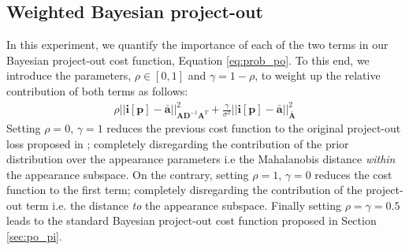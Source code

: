 





\subsection{Weighted Bayesian project-out}

In this experiment, we quantify the importance of each of the two terms in our Bayesian project-out cost function, Equation \ref{eq:prob_po}. To this end, we introduce the parameters, $\rho \in [0, 1]$ and $\gamma = 1 - \rho$, to weight up the relative contribution of both terms as follows:
\begin{equation}
    \begin{aligned}
        \rho|| \mathbf{i}[\mathbf{p}] - \mathbf{\bar{a}} ||^2_{\mathbf{A}\mathbf{D}^{-1}\mathbf{A}^T} 
        + 
        \frac{\gamma}{\sigma^2}|| \mathbf{i}[\mathbf{p}] - \mathbf{\bar{a}} ||^2_{\bar{\mathbf{A}}}
    \end{aligned}
    \label{eq:weighted_po}
\end{equation}
Setting $\rho=0$, $\gamma=1$ reduces the previous cost function to the original project-out loss proposed in \cite{Matthews2004}; completely disregarding the contribution of the prior distribution over the appearance parameters i.e the Mahalanobis distance \emph{within} the appearance subspace. On the contrary, setting $\rho=1$, $\gamma=0$ reduces the cost function to the first term; completely disregarding the contribution of the project-out term i.e. the distance \emph{to} the appearance subspace. Finally setting $\rho=\gamma=0.5$ leads to the standard Bayesian project-out cost function proposed in Section \ref{sec:po_pi}.
 
